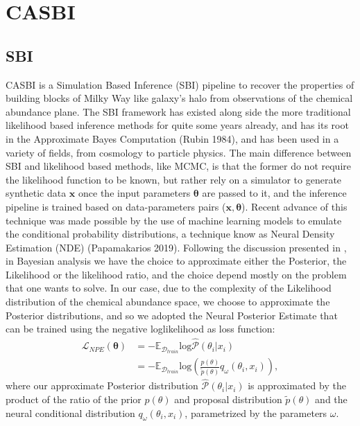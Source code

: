 \chapter{CASBI}

\section{SBI}
CASBI is a Simulation Based Inference (SBI) pipeline to recover the properties of building blocks of Milky Way like galaxy's halo from observations of the chemical abundance plane. The SBI framework has existed along side the more traditional likelihood based inference methods for quite some years already, and has its root in the Approximate Bayes Computation (Rubin 1984), and has been used in a variety of fields, from cosmology to particle physics. The main difference between SBI and likelihood based methods, like MCMC, is that the former do not require the likelihood function to be known, but rather rely on a simulator to generate synthetic data \textbf{$\mathbf{x}$} once the input parameters $\boldsymbol{\theta}$ are passed to it, and the inference pipeline is trained based on data-parameters pairs ($\mathbf{x}, \boldsymbol{\theta}$). Recent advance of this technique was made possible by the use of machine learning models to emulate the conditional probability distributions, a technique know as Neural Density Estimation (NDE) (Papamakarios 2019). Following the discussion presented in \cite{hoLtUILIAllinOneFramework2024}, in Bayesian analysis we have the choice to approximate either the Posterior, the Likelihood or the likelihood ratio, and the choice depend mostly on the problem that one wants to solve. In our case, due to the complexity of the Likelihood distribution of the chemical abundance space, we choose to approximate the Posterior distributions, and so we adopted the Neural Posterior Estimate that can be trained using the negative loglikelihood as loss function:
\begin{equation}
\begin{aligned}
    \mathcal{L}_{NPE}(\boldsymbol{\theta}) &= - \mathbb{E}_{\mathcal{D}_{train}} \text{log} \hat{\mathcal{P}}(\theta_i | x_i) \\ 
    &= - \mathbb{E}_{\mathcal{D}_{train}} \text{log} \left( \frac{p(\theta)}{\tilde{p}(\theta)} q_{\omega}(\theta_i, x_i) \right), 
\end{aligned}
\end{equation}
where our approximate Posterior distribution $ \hat{\mathcal{P}}(\theta_i | x_i)$ is approximated by the product of the ratio of the prior $p(\theta)$ and proposal distribution $\tilde{p}(\theta)$ and the neural conditional distribution $q_{\omega}(\theta_i, x_i)$, parametrized by the parameters $\omega$. 

